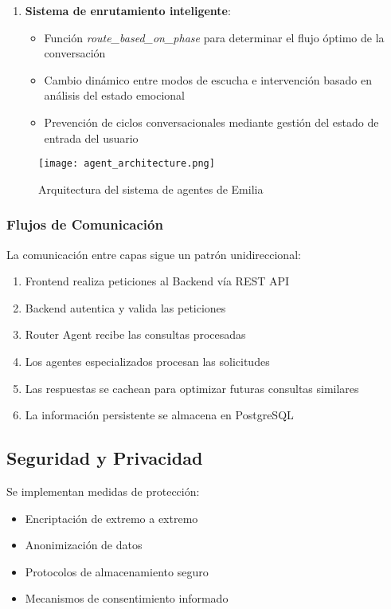 \documentclass[conference]{IEEEtran}
\begin{document}
\begin{enumerate}
\item \textbf{Sistema de enrutamiento inteligente}:
    \begin{itemize}
    \item Función \textit{route\_based\_on\_phase} para determinar el flujo óptimo de la conversación
    \item Cambio dinámico entre modos de escucha e intervención basado en análisis del estado emocional
    \item Prevención de ciclos conversacionales mediante gestión del estado de entrada del usuario
    \end{itemize}
\end{enumerate}

\begin{figure}[h]
\centering
\texttt{[image: agent\_architecture.png]}
\caption{Arquitectura del sistema de agentes de Emilia}
\label{fig:agent_architecture}
\end{figure}

\subsubsection{Flujos de Comunicación}
La comunicación entre capas sigue un patrón unidireccional:

\begin{enumerate}
\item Frontend realiza peticiones al Backend vía REST API
\item Backend autentica y valida las peticiones
\item Router Agent recibe las consultas procesadas
\item Los agentes especializados procesan las solicitudes
\item Las respuestas se cachean para optimizar futuras consultas similares
\item La información persistente se almacena en PostgreSQL
\end{enumerate}

\subsection{Seguridad y Privacidad}
Se implementan medidas de protección:
\begin{itemize}
\item Encriptación de extremo a extremo
\item Anonimización de datos
\item Protocolos de almacenamiento seguro
\item Mecanismos de consentimiento informado
\end{itemize}
\end{document}
